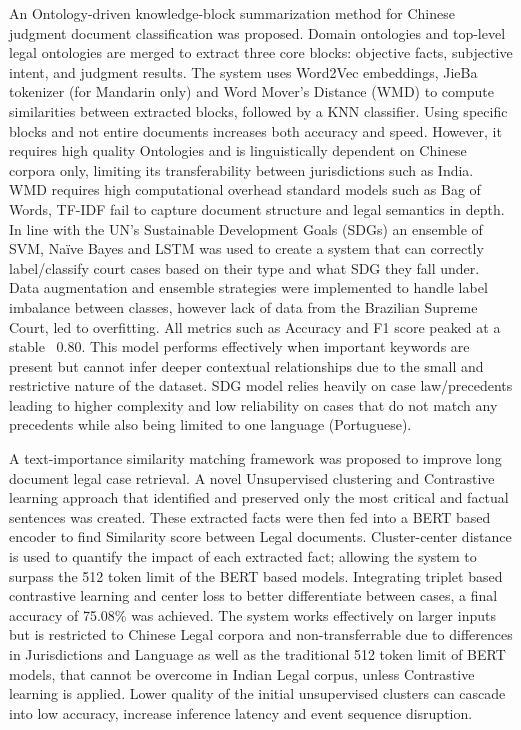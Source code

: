 An Ontology-driven knowledge-block summarization method for Chinese judgment document classification was proposed. Domain ontologies and top-level legal ontologies are merged to extract three core blocks: objective facts, subjective intent, and judgment results. The system\cite{b6} uses Word2Vec embeddings, JieBa tokenizer (for Mandarin only) and Word Mover’s Distance (WMD) to compute similarities between extracted blocks, followed by a KNN classifier. Using specific blocks and not entire documents increases both accuracy and speed. However, it requires high quality Ontologies and is linguistically dependent on Chinese corpora only, limiting its transferability between jurisdictions such as India. WMD requires high computational overhead standard models such as Bag of Words, TF-IDF fail to capture document structure and legal semantics in depth.
In line with the UN’s Sustainable Development Goals (SDGs) an ensemble of SVM, Naïve Bayes and LSTM was used to create a system that can correctly label/classify court cases based on their type and what SDG they fall under\cite{b7}. Data augmentation and ensemble strategies were implemented to handle label imbalance between classes, however lack of data from the Brazilian Supreme Court, led to overfitting. All metrics such as Accuracy and F1 score peaked at a stable ~0.80. This model performs effectively when important keywords are present but cannot infer deeper contextual relationships due to the small and restrictive nature of the dataset. SDG model relies heavily on case law/precedents leading to higher complexity and low reliability on cases that do not match any precedents while also being limited to one language (Portuguese).



A text-importance similarity matching framework was proposed to improve long document legal case retrieval. A novel Unsupervised clustering and Contrastive learning approach that identified and preserved only the most critical and factual sentences was created\cite{b8}. These extracted facts were then fed into a BERT based encoder to find Similarity score between Legal documents. Cluster-center distance is used to quantify the impact of each extracted fact; allowing the system to surpass the 512 token limit of the BERT based models. Integrating triplet based contrastive learning and center loss to better differentiate between cases, a final accuracy of 75.08\% was achieved. The system works effectively on larger inputs but is restricted to Chinese Legal corpora and non-transferrable due to differences in Jurisdictions and Language as well as the traditional 512 token limit of BERT models, that cannot be overcome in Indian Legal corpus, unless Contrastive learning is applied. Lower quality of the initial unsupervised clusters can cascade into low accuracy, increase inference latency and event sequence disruption.




